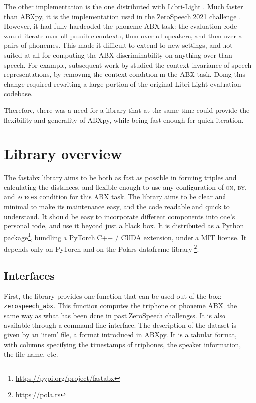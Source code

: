 \documentclass[11pt]{article}
\newcommand{\py}[1]{\texttt{#1}\xspace}
\newcommand{\on}{\textsc{on}\xspace}
\newcommand{\by}{\textsc{by}\xspace}
\newcommand{\across}{\textsc{across}\xspace}
\begin{document}
The other implementation is the one distributed with Libri-Light \citep{kahn2020librilight}. Much faster than ABXpy, it is the implementation used in the ZeroSpeech 2021 challenge \citep{nguyen2020zeroresourcespeechbenchmark}. However, it had fully hardcoded the phoneme ABX task: the evaluation code would iterate over all possible contexts, then over all speakers, and then over all pairs of phonemes. This made it difficult to extend to new settings, and not suited at all for computing the ABX discriminability on anything over than speech. For example, subsequent work by \citet{hallap2023evaluating} studied the context-invariance of speech representations, by removing the context condition in the ABX task. Doing this change required rewriting a large portion of the original Libri-Light evaluation codebase.

Therefore, there was a need for a library that at the same time could provide the flexibility and generality of ABXpy, while being fast enough for quick iteration.

\section{Library overview}

The fastabx library aims to be both as fast as possible in forming triples and calculating the distances, and flexible enough to use any configuration of \on, \by, and \across condition for this ABX task. The library aims to be clear and minimal to make its maintenance easy, and the code readable and quick to understand. It should be easy to incorporate different components into one’s personal code, and use it beyond just a black box. It is distributed as a Python package\footnote{\url{https://pypi.org/project/fastabx}}, bundling a PyTorch C++ / CUDA extension, under a MIT license. It depends only on PyTorch \citep{paszke2019pytorch} and on the Polars dataframe library \footnote{\url{https://pola.rs}}.

\subsection{Interfaces}
First, the library provides one function that can be used out of the box: \py{zerospeech_abx}. This function computes the triphone or phoneme ABX, the same way as what has been done in past ZeroSpeech challenges. It is also available through a command line interface. The description of the dataset is given by an `item' file, a format introduced in ABXpy. It is a tabular format, with columns specifying the timestamps of triphones, the speaker information, the file name, etc.
\end{document}
